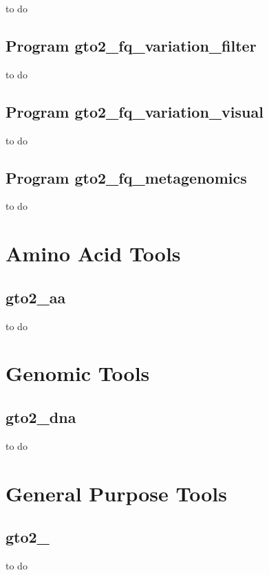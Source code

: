 \documentclass[11pt,]{krantz}
\begin{document}
to do

\section{Program
gto2\_fq\_variation\_filter}\label{program-gto2_fq_variation_filter}

to do

\section{Program
gto2\_fq\_variation\_visual}\label{program-gto2_fq_variation_visual}

to do

\section{Program
gto2\_fq\_metagenomics}\label{program-gto2_fq_metagenomics}

to do

\chapter{Amino Acid Tools}\label{amino-acid-tools}

\section{gto2\_aa}\label{gto2_aa}

to do

\chapter{Genomic Tools}\label{genomic-tools}

\section{gto2\_dna}\label{gto2_dna}

to do

\chapter{General Purpose Tools}\label{general-purpose-tools}

\section{gto2\_}\label{gto2_}

to do



\printindex
\end{document}
